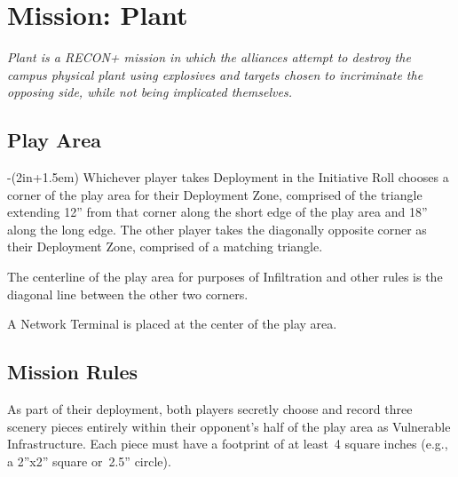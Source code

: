 \chapter{Mission: Plant}

\emph{\emph{Plant} is a RECON+ mission in which the alliances attempt
  to destroy the campus physical plant using explosives and targets
  chosen to incriminate the opposing side, while not being implicated
  themselves.}

\section{Play Area}
\vspace{-2\parskip}
\noindent\begin{stdminipage}{\linewidth-(2in+1.5em)}
\vspace{0pt}   
\noindent
Whichever player takes Deployment in the Initiative Roll chooses a
corner of the play area for their Deployment Zone, comprised of the
triangle extending 12'' from that corner along the short edge of the
play area and 18'' along the long edge.  The other player takes the
diagonally opposite corner as their Deployment Zone, comprised of a
matching triangle.

The centerline of the play area for purposes of Infiltration and other
rules is the diagonal line between the other two corners.

A Network Terminal is placed at the center of the play area.

\section{Mission Rules}
As part of their deployment, both players secretly choose and record
three scenery pieces entirely within their opponent's half of the play
area as Vulnerable Infrastructure.  Each piece must have a footprint
of at least~4 square inches (e.g., a 2''x2'' square or~2.5'' circle).

\end{stdminipage}
\hfill
